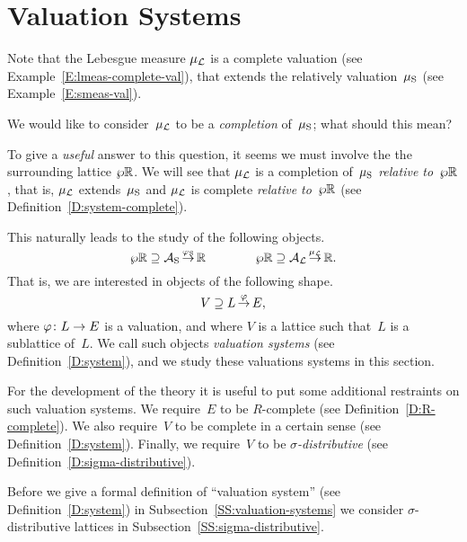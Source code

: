 \documentclass[main.tex]{subfiles}
\begin{document}
\section{Valuation Systems}
\label{S:valuation-systems}
Note that the Lebesgue measure $\mu_{\mathcal{L}}$
is a complete valuation (see Example~\ref{E:lmeas-complete-val}),
that extends the relatively  valuation~$\mu_{\mathrm{S}}$
(see Example~\ref{E:smeas-val}).

We would like to consider~$\mu_{\mathcal{L}}$ to be a \emph{completion} of~$\mu_{\mathrm{S}}$;
what should this mean?

To give a \emph{useful} answer to this question,
it seems we must involve the 
the surrounding lattice $\wp \mathbb{R}$.
We will see that $\mu_{\mathcal{L}}$ is a completion of~$\mu_{\mathrm{S}}$
\emph{relative to}~$\wp \mathbb{R}$,
that is,
$\mu_{\mathcal{L}}$ extends~$\mu_{\mathrm{S}}$
and $\mu_{\mathcal{L}}$ is complete \emph{relative to~$\wp\mathbb{R}$}
(see Definition~\ref{D:system-complete}).

This naturally leads to the study of the following objects.
\begin{equation*}
\wp{\mathbb{R}} \supseteq \mathcal{A}_{\mathrm{S}}\,\smash{\stackrel{\varphi_{\mathrm{S}}}{\rightarrow}}\,\mathbb{R} \qquad\qquad \wp{\mathbb{R}} \supseteq \mathcal{A}_{\mathcal{L}}\,\smash{\stackrel{\mu_{\mathcal{L}}}{\rightarrow}}\,\mathbb{R}.
\end{equation*}
That is, we are interested in objects of the following shape.
\begin{equation*}
V \supseteq L\,\smash{\stackrel{\varphi}{\rightarrow}}\,E,
\end{equation*}
where $\varphi\colon L \rightarrow E$ is a valuation,
and where $V$ is a lattice such that~$L$ is a sublattice of~$L$.
We call such objects \emph{valuation systems}
(see Definition~\ref{D:system}),
and we study these valuations systems in this section.

For the development of the theory
it is useful to put some additional restraints on
such valuation systems. 
We require~$E$ to be $R$-complete
(see Definition~\ref{D:R-complete}).
We also require~$V$ to be complete in a certain sense
(see Definition~\ref{D:system}).
Finally, we require~$V$ to be \emph{$\sigma$-distributive}
(see Definition~\ref{D:sigma-distributive}).

Before we give a formal definition
of ``valuation system'' (see Definition~\ref{D:system})
in Subsection~\ref{SS:valuation-systems}
we consider $\sigma$-distributive lattices
in Subsection~\ref{SS:sigma-distributive}.
%
%
\end{document}
